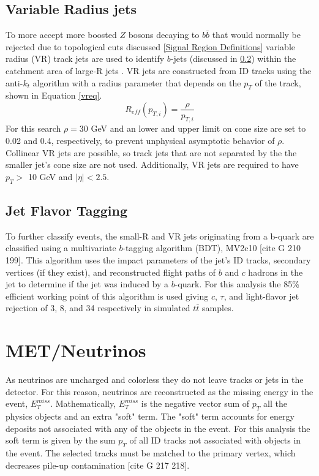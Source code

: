 \subsection{Variable Radius jets}
To more accept more boosted $Z$ bosons decaying to $b\bar{b}$ that would normally be rejected due to topological cuts discussed \ref{Signal Region Definitions} variable radius (VR) track jets are used to identify $b$-jets (discussed in \ref{Jet Flavor Tagging}) within the catchment area of large-R jets \cite{vrjets}. VR jets are constructed from ID tracks using the anti-$k_{t}$ algorithm with a radius parameter that depends on the $p_{T}$ of the track, shown in Equation \ref{vreq}.
\begin{equation}
R_{eff}(p_{T, i}) = \frac{\rho}{p_{T,i}}
\label{vreq}
\end{equation}
For this search $\rho=30$ GeV and an lower and upper limit on cone size are set to 0.02 and 0.4, respectively, to prevent unphysical asymptotic behavior of $\rho$. Collinear VR jets are possible, so track jets that are not separated by the the smaller jet's cone size are not used. Additionally, VR jets are required to have $p_{T} > $ 10 GeV and $|\eta| < 2.5$. 

\subsection{Jet Flavor Tagging}
\label{Jet Flavor Tagging}
To further classify events, the small-R and VR jets originating from a b-quark are classified using a multivariate $b$-tagging algorithm (BDT), MV2c10 [cite G 210 199]. This algorithm uses the impact parameters of the jet's ID tracks, secondary vertices (if they exist), and reconstructed flight paths of $b$ and $c$ hadrons in the jet to determine if the jet was induced by a $b$-quark. For this analysis the 85\% efficient working point of this algorithm is used giving $c$, $\tau$, and light-flavor jet rejection of 3, 8, and 34 respectively in simulated $t\bar{t}$ samples.

\section{MET/Neutrinos}
As neutrinos are uncharged and colorless they do not leave tracks or jets in the detector. For this reason, neutrinos are reconstructed as the missing energy in the event, $E_{T}^{miss}$. Mathematically, $E_{T}^{miss}$ is the negative vector sum of $p_{T}$ all the physics objects and an extra "soft" term. The "soft" term accounts for energy deposits not associated with any of the objects in the event. For this analysis the soft term is given by the sum $p_{T}$ of all ID tracks not associated with objects in the event. The selected tracks must be matched to the primary vertex, which decreases pile-up contamination [cite G 217 218]. 

